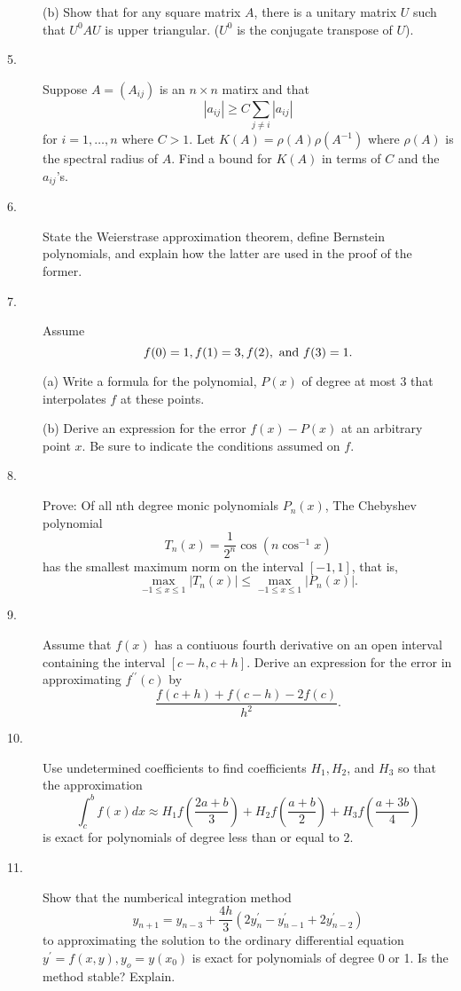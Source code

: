 \documentclass{article}
\begin{document}
\begin{description}
\item[\quad] (b)
Show that for any square matrix $A$, there is a unitary matrix $U$ such
that $U^0 AU$ is upper triangular. ($U^0$ is the conjugate transpose
of $U$).

\item[5.]
Suppose $A=(A_{ij})$ is an $n \times n$ matirx and that
$$|a_{ij}| \geq C \sum_{j \neq i} |a_{ij}|$$
for $i = 1, \dots, n$ where $C>1$. Let
$K(A) = \rho (A) \rho(A^{-1})$ where $\rho(A)$ is the spectral radius of
$A$. Find a bound for $K(A)$ in terms of $C$ and the $a_{ij}$'s.

\item[6.]
State the Weierstrase approximation theorem, define Bernstein polynomials, and
explain how the latter are used in the proof of the former.

\item[7.]
Assume
$$f(0) = 1, f(1) = 3, f(2), \hbox{\ and\ } f(3) = 1.$$

\item[\quad] (a)
Write a formula for the polynomial, $P(x)$ of degree at most 3 that
interpolates $f$ at these points.

\item[\quad] (b)
Derive an expression for the error $f(x) - P(x)$ at an arbitrary point $x$.
Be sure to indicate the conditions assumed on $f$.

\item[8.]
Prove: Of all nth degree monic polynomials $P_n(x)$, The Chebyshev
polynomial
$$T_n (x) = \frac{1}{2^n} \cos (n \cos^{-1} x)$$
has the smallest maximum norm on the interval $[-1,1]$, that is,
$$\max_{-1 \leq x \leq 1} |T_n(x) | \leq \max_{-1 \leq x \leq 1}
 |P_n(x)|.$$

\item[9.]
Assume that $f(x)$ has a contiuous fourth derivative on an open interval
containing the interval $[c-h, c+h]$. Derive an expression for the error
in approximating $f^{\prime \prime} (c)$ by
$$\frac{f(c+h) + f(c-h) - 2f (c)}{h^2}.$$

\item[10.]
Use undetermined coefficients to find coefficients $H_1, H_2$, and $H_3$
so that the approximation
$$\int^b_c f(x) dx \approx H_1 f \left(\frac{2a + b}{3} \right) + H_2f
  \left(\frac{a+b}{2} \right) + H_3f \left( \frac{a+3b}{4} \right)$$
is exact for polynomials of degree less than or equal to 2.

\item[11.]
Show that the numberical integration method
$$y_{n+1} = y_{n-3} + \frac{4h}{3} \left(2y^\prime_n - y^\prime_{n-1} +
  2y^\prime_{n-2} \right)$$
to approximating the solution to the ordinary differential equation
$y^\prime = f(x,y), y_o = y(x_0)$ is exact for polynomials of degree 0 or 1.
Is the method stable? Explain.




\end{description}    
\end{document}
